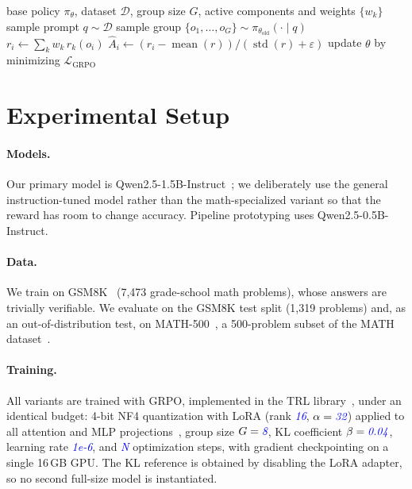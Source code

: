 \documentclass[11pt]{article}
\newcommand{\res}[1]{\textcolor{blue}{\textit{#1}}}   %
\begin{document}
\begin{algorithm}[t]
\caption{GRPO training with composite reward (one variant)}
\label{alg:grpo}
\begin{algorithmic}[1]
\Require base policy $\pi_\theta$, dataset $\mathcal{D}$, group size $G$,
         active components and weights $\{w_k\}$
  \State sample prompt $q \sim \mathcal{D}$
  \State sample group $\{o_1,\dots,o_G\} \sim \pi_{\theta_{\text{old}}}(\cdot\mid q)$
    \State $r_i \gets \sum_k w_k\, r_k(o_i)$ 
  \EndFor
  \State $\hat{A}_i \gets (r_i - \operatorname{mean}(r)) / (\operatorname{std}(r) + \varepsilon)$
  \State update $\theta$ by minimizing $\mathcal{L}_{\text{GRPO}}$
\EndFor
\end{algorithmic}
\end{algorithm}

\section{Experimental Setup}
\label{sec:setup}

\paragraph{Models.}
Our primary model is Qwen2.5-1.5B-Instruct~\citep{qwen25}; we deliberately use
the general instruction-tuned model rather than the math-specialized variant so
that the reward has room to change accuracy. Pipeline prototyping uses
Qwen2.5-0.5B-Instruct.

\paragraph{Data.}
We train on GSM8K~\citep{gsm8k} (7{,}473 grade-school math problems), whose
answers are trivially verifiable. We evaluate on the GSM8K test split
(1{,}319 problems) and, as an out-of-distribution test, on
MATH-500~\citep{lightman2023}, a 500-problem subset of the MATH
dataset~\citep{mathdataset}.

\paragraph{Training.}
All variants are trained with GRPO, implemented in the TRL
library~\citep{trl}, under an identical budget: 4-bit NF4
quantization with LoRA (rank \res{16}, $\alpha=\res{32}$) applied to all
attention and MLP projections~\citep{lora,qlora}, group size $G=\res{8}$, KL
coefficient $\beta=\res{0.04}$, learning rate \res{1e-6}, and \res{N} optimization
steps, with gradient checkpointing on a single 16\,GB GPU. The KL reference is
obtained by disabling the LoRA adapter, so no second full-size model is
instantiated.
\end{document}
